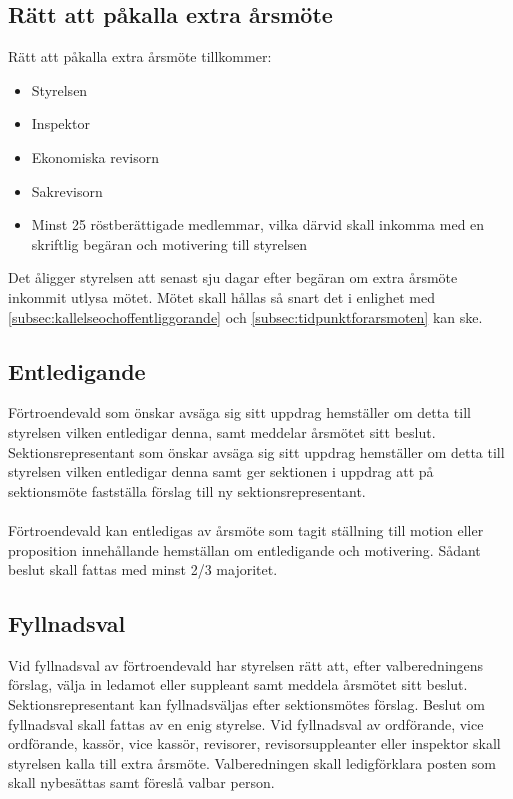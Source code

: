 	\subsection{Rätt att påkalla extra årsmöte}
	\label{subsec:rattattpakallaextraarsmote}
		Rätt att påkalla extra årsmöte tillkommer:
		\begin{itemize}
		\setlength{\itemsep}{0.0cm}
		\setlength{\parskip}{0.0cm}
			\item Styrelsen
			\item Inspektor
			\item Ekonomiska revisorn
			\item Sakrevisorn
			\item Minst 25 röstberättigade medlemmar, vilka därvid skall inkomma med en skriftlig begäran och motivering till styrelsen
		\end{itemize}

	Det åligger styrelsen att senast sju dagar efter begäran om extra årsmöte inkommit utlysa mötet. Mötet skall hållas så snart det i enlighet med \ref{subsec:kallelseochoffentliggorande} och \ref{subsec:tidpunktforarsmoten} kan ske.

\clearpage
	\subsection{Entledigande}
	\label{subsec:entledigande}
		Förtroendevald som önskar avsäga sig sitt uppdrag hemställer om detta till styrelsen vilken entledigar denna, samt meddelar årsmötet sitt beslut. Sektionsrepresentant som önskar avsäga sig sitt uppdrag hemställer om detta till styrelsen vilken entledigar denna samt ger sektionen i uppdrag att på sektionsmöte fastställa förslag till ny sektionsrepresentant.\\ \\
		Förtroendevald kan entledigas av årsmöte som tagit ställning till motion eller proposition innehållande hemställan om entledigande och motivering. Sådant beslut skall fattas med minst 2/3 majoritet.

	\subsection{Fyllnadsval}
	\label{subsec:fyllnadsval}
		Vid fyllnadsval av förtroendevald har styrelsen rätt att, efter valberedningens förslag, välja in ledamot eller suppleant samt meddela årsmötet sitt beslut. Sektionsrepresentant kan fyllnadsväljas efter sektionsmötes förslag. Beslut om fyllnadsval skall fattas av en enig styrelse. Vid fyllnadsval av ordförande, vice ordförande, kassör, vice kassör, revisorer, revisorsuppleanter eller inspektor skall styrelsen kalla till extra årsmöte. Valberedningen skall ledigförklara posten som skall nybesättas samt föreslå valbar person.
